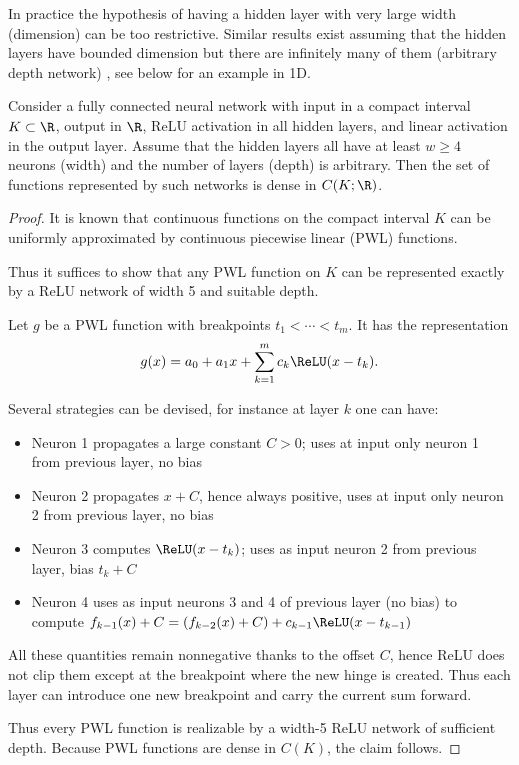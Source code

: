 \begin{tcolorbox}[advancedbox]
\begin{advancedtopics}\label{adv:ch7-deep-narrow}
In practice the hypothesis of having a hidden layer with very large width (dimension) can be too restrictive. Similar results exist assuming that the hidden layers have bounded dimension but there are infinitely many of them (arbitrary depth network) \cite{turinici14}, see below for an example in 1D.
\end{advancedtopics}
\end{tcolorbox}

\begin{theorem}\label{thm:ch7-deep-narrow}
Consider a fully connected neural network with input in a compact interval $K \subset \R$, output in $\R$, ReLU activation in all hidden layers, and linear activation in the output layer. Assume that the hidden layers all have at least $w \geq 4$ neurons (width) and the number of layers (depth) is arbitrary. Then the set of functions represented by such networks is dense in $C(K; \R)$.
\end{theorem}

\begin{proof}
It is known that continuous functions on the compact interval $K$ can be uniformly approximated by continuous piecewise linear (PWL) functions.

Thus it suffices to show that any PWL function on $K$ can be represented exactly by a ReLU network of width 5 and suitable depth.

Let $g$ be a PWL function with breakpoints $t_1 < \cdots < t_m$. It has the representation
\begin{equation}\label{eq:ch7-pwl-repr}
  g(x) = a_0 + a_1 x + \sum_{k=1}^{m} c_k \ReLU(x - t_k).
\end{equation}

Several strategies can be devised, for instance at layer $k$ one can have:
\begin{itemize}
  \item Neuron 1 propagates a large constant $C > 0$; uses at input only neuron 1 from previous layer, no bias
  \item Neuron 2 propagates $x + C$, hence always positive, uses at input only neuron 2 from previous layer, no bias
  \item Neuron 3 computes $\ReLU(x - t_k)$; uses as input neuron 2 from previous layer, bias $t_k + C$
  \item Neuron 4 uses as input neurons 3 and 4 of previous layer (no bias) to compute $f_{k-1}(x) + C = (f_{k-2}(x) + C) + c_{k-1} \ReLU(x - t_{k-1})$
\end{itemize}
All these quantities remain nonnegative thanks to the offset $C$, hence ReLU does not clip them except at the breakpoint where the new hinge is created. Thus each layer can introduce one new breakpoint and carry the current sum forward.

Thus every PWL function is realizable by a width-5 ReLU network of sufficient depth. Because PWL functions are dense in $C(K)$, the claim follows.
\end{proof}

